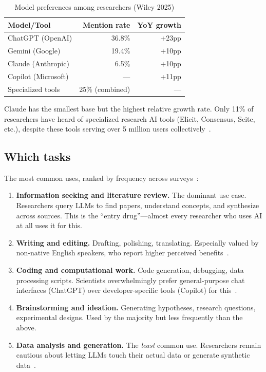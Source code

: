 \documentclass[11pt,a4paper]{article}
\begin{document}
\begin{table}[h]
\centering
\caption{Model preferences among researchers (Wiley 2025)}
\label{tab:models}
\begin{tabular}{lrr}
\toprule
\textbf{Model/Tool} & \textbf{Mention rate} & \textbf{YoY growth} \\
\midrule
ChatGPT (OpenAI) & 36.8\% & +23pp \\
Gemini (Google) & 19.4\% & +10pp \\
Claude (Anthropic) & 6.5\% & +10pp \\
Copilot (Microsoft) & --- & +11pp \\
Specialized tools & 25\% (combined) & --- \\
\bottomrule
\end{tabular}
\end{table}

Claude has the smallest base but the highest relative growth rate. Only 11\% of researchers have heard of specialized research AI tools (Elicit, Consensus, Scite, etc.), despite these tools serving over 5 million users collectively~\cite{wiley2025}.

\subsection{Which tasks}

The most common uses, ranked by frequency across surveys~\cite{liao2024,wiley2025,sciwhoprogram2025}:

\begin{enumerate}
\item \textbf{Information seeking and literature review.} The dominant use case. Researchers query LLMs to find papers, understand concepts, and synthesize across sources. This is the ``entry drug''---almost every researcher who uses AI at all uses it for this.

\item \textbf{Writing and editing.} Drafting, polishing, translating. Especially valued by non-native English speakers, who report higher perceived benefits~\cite{liao2024}.

\item \textbf{Coding and computational work.} Code generation, debugging, data processing scripts. Scientists overwhelmingly prefer general-purpose chat interfaces (ChatGPT) over developer-specific tools (Copilot) for this~\cite{sciwhoprogram2025}.

\item \textbf{Brainstorming and ideation.} Generating hypotheses, research questions, experimental designs. Used by the majority but less frequently than the above.

\item \textbf{Data analysis and generation.} The \emph{least} common use. Researchers remain cautious about letting LLMs touch their actual data or generate synthetic data~\cite{liao2024}.
\end{enumerate}
\end{document}
